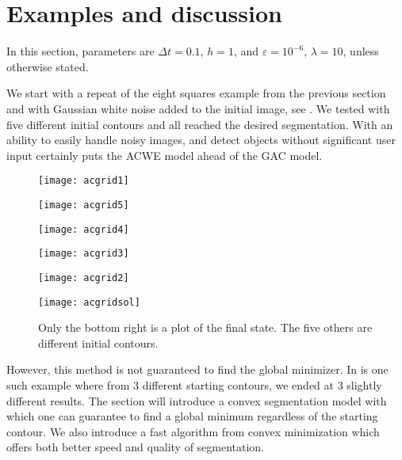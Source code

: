 \section{Examples and discussion}
In this section, parameters are $\Delta t = 0.1$, $h = 1$, and $\varepsilon = 10^{-6}$, $\lambda = 10$, unless otherwise stated.

We start with a repeat of the eight squares example from the previous section and with Gaussian white noise added to the initial image, see . We tested with five different initial contours and all reached the desired segmentation. With an ability to easily handle noisy images, and detect objects without significant user input certainly puts the ACWE model ahead of the GAC model.

\begin{figure}[htb!]
	\centering
	\begin{minipage}{0.31\textwidth}
		\texttt{[image: acgrid1]}
	\end{minipage}%
	\begin{minipage}{0.31\textwidth}
		\texttt{[image: acgrid5]}
	\end{minipage}%
	\begin{minipage}{0.31\textwidth}
		\texttt{[image: acgrid4]}
	\end{minipage}
	\begin{minipage}{0.31\textwidth}
		\texttt{[image: acgrid3]}
	\end{minipage}%
	\begin{minipage}{0.31\textwidth}
		\texttt{[image: acgrid2]}
	\end{minipage}%
	\begin{minipage}{0.31\textwidth}
		\texttt{[image: acgridsol]}
	\end{minipage}
	
	\caption{Only the bottom right  is a plot of the final state. The five others are different initial contours.}
	\label{fig:grid_acwe}
\end{figure}
However, this method is not guaranteed to find the global minimizer. In  is one such example where from 3 different starting contours, we ended at 3 slightly different results. The section will introduce a convex segmentation model with which one can guarantee to find a global minimum regardless of the starting contour. We also introduce a fast algorithm from convex minimization which offers both better speed and quality of segmentation.
